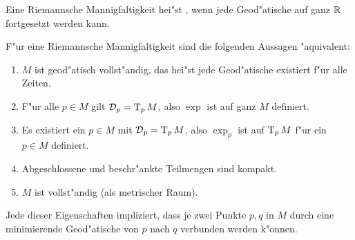 \begin{Dfn}
  Eine Riemannsche Mannigfaltigkeit hei"st , wenn jede Geod"atische auf ganz $\operatorname{\mathbb{R}}$ fortgesetzt werden kann.
\end{Dfn}

\begin{Satz}\label{satz-8-11}\label{hopf-rinow}
  F"ur eine Riemannsche Mannigfaltigkeit sind die folgenden Aussagen "aquivalent:
  \begin{enumerate}[label=(\roman*),widest=iii]
  \item $M$ ist geod"atisch vollst"andig, das hei"st jede Geod"atische existiert f"ur alle Zeiten.
  \item F"ur alle $p \in M$ gilt $\operatorname{\mathcal{D}}_p = \operatorname{T}_pM$, also $\exp$ ist auf ganz $M$ definiert.
  \item Es existiert ein $p \in M$ mit $\operatorname{\mathcal{D}}_p = \operatorname{T}_pM$, also $\exp_p$ ist auf $\operatorname{T}_pM$ f"ur ein $p \in M$ definiert.
  \item Abgeschlossene und beschr"ankte Teilmengen sind kompakt.
  \item $M$ ist vollst"andig (als metrischer Raum).
  \end{enumerate}
  Jede dieser Eigenschaften impliziert, dass je zwei Punkte $p, q$ in $M$ durch eine minimierende Geod"atische von $p$ nach $q$ verbunden werden k"onnen.
\end{Satz}

